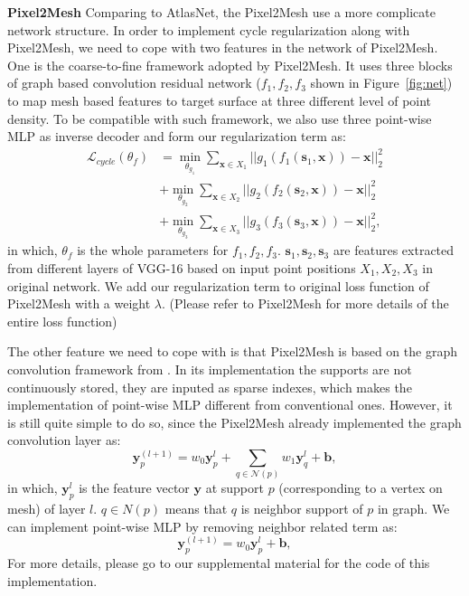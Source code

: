 \noindent\textbf{Pixel2Mesh}
Comparing to AtlasNet, the Pixel2Mesh\cite{pixel2mesh} use a more complicate network structure. In order to implement cycle regularization along with Pixel2Mesh, we need to cope with two features in the network of Pixel2Mesh. 
One is the coarse-to-fine framework adopted by Pixel2Mesh. It uses three blocks of graph based convolution residual network ($f_1,f_2,f_3$ shown in Figure~\ref{fig:net}) to map mesh based features to target surface at three different level of point density. To be compatible with such framework, we also use three point-wise MLP as inverse decoder and form our regularization term as:
\begin{equation}
\begin{aligned}
\mathcal{L}_{cycle}(\theta_f) &=  \min_{\theta_{g_1}}\sum_{\mathbf{x} \in X_1}||g_{1}(f_{1}(\mathbf{s}_1,\mathbf{x})) - \mathbf{x}||_2^2\\
&+ \min_{\theta_{g_2}}\sum_{\mathbf{x} \in X_2}||g_{2}(f_{2}(\mathbf{s}_2,\mathbf{x})) - \mathbf{x}||_2^2\\
&+ \min_{\theta_{g_3}}\sum_{\mathbf{x} \in X_3}||g_{3}(f_{3}(\mathbf{s}_3,\mathbf{x})) - \mathbf{x}||_2^2,
\end{aligned}
\end{equation}
in which, $\theta_f$ is the whole parameters for $f_1,f_2,f_3$. $\mathbf{s}_1,\mathbf{s}_2,\mathbf{s}_3$ are features extracted from different layers of VGG-16 based on input point positions $X_1,X_2,X_3$ in original network. We add our regularization term to original loss function of Pixel2Mesh with a weight $\lambda$. (Please refer to Pixel2Mesh\cite{pixel2mesh} for more details of the entire loss function)

The other feature we need to cope with is that Pixel2Mesh is based on the graph convolution framework from \cite{graphconv}. In its implementation the supports are not continuously stored, they are inputed as sparse indexes, which makes the implementation of point-wise MLP different from conventional ones. However, it is still quite simple to do so, since the Pixel2Mesh already implemented the graph convolution layer as:
\begin{equation}
\mathbf{y}_p^{(l+1)} = w_0 \mathbf{y}_p^l + \sum_{q\in\mathcal{N}(p)} w_1\mathbf{y}_q^l + \mathbf{b},
\end{equation}
in which,  $\mathbf{y}_p^l$ is the feature vector $\mathbf{y}$ at support $p$ (corresponding to a vertex on mesh) of layer $l$. $q\in N(p)$ means that $q$ is neighbor support of $p$ in graph. We can implement point-wise MLP by removing neighbor related term as:
\begin{equation}
\mathbf{y}_p^{(l+1)} = w_0 \mathbf{y}_p^l + \mathbf{b},
\end{equation}
For more details, please go to our supplemental material for the code of this implementation.

